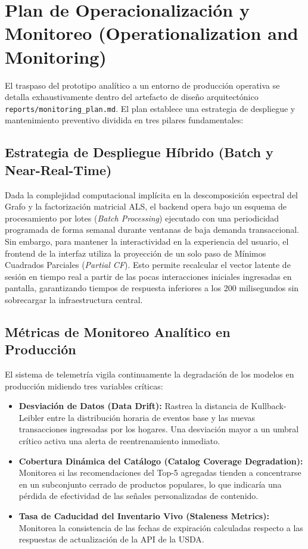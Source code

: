 \documentclass[11pt,a4paper]{article}
\begin{document}
\section{Plan de Operacionalización y Monitoreo (Operationalization and Monitoring)}
El traspaso del prototipo analítico a un entorno de producción operativa se detalla exhaustivamente dentro del artefacto de diseño arquitectónico \texttt{reports/monitoring\_plan.md}. El plan establece una estrategia de despliegue y mantenimiento preventivo dividida en tres pilares fundamentales:

\subsection{Estrategia de Despliegue Híbrido (Batch y Near-Real-Time)}
Dada la complejidad computacional implícita en la descomposición espectral del Grafo y la factorización matricial ALS, el backend opera bajo un esquema de procesamiento por lotes (\textit{Batch Processing}) ejecutado con una periodicidad programada de forma semanal durante ventanas de baja demanda transaccional. Sin embargo, para mantener la interactividad en la experiencia del usuario, el frontend de la interfaz utiliza la proyección de un solo paso de Mínimos Cuadrados Parciales (\textit{Partial CF}). Esto permite recalcular el vector latente de sesión en tiempo real a partir de las pocas interacciones iniciales ingresadas en pantalla, garantizando tiempos de respuesta inferiores a los 200 milisegundos sin sobrecargar la infraestructura central.

\subsection{Métricas de Monitoreo Analítico en Producción}
El sistema de telemetría vigila continuamente la degradación de los modelos en producción midiendo tres variables críticas:
\begin{itemize}
    \item \textbf{Desviación de Datos (Data Drift):} Rastrea la distancia de Kullback-Leibler entre la distribución horaria de eventos base y las nuevas transacciones ingresadas por los hogares. Una desviación mayor a un umbral crítico activa una alerta de reentrenamiento inmediato.
    \item \textbf{Cobertura Dinámica del Catálogo (Catalog Coverage Degradation):} Monitorea si las recomendaciones del Top-5 agregadas tienden a concentrarse en un subconjunto cerrado de productos populares, lo que indicaría una pérdida de efectividad de las señales personalizadas de contenido.
    \item \textbf{Tasa de Caducidad del Inventario Vivo (Staleness Metrics):} Monitorea la consistencia de las fechas de expiración calculadas respecto a las respuestas de actualización de la API de la USDA.
\end{itemize}
\end{document}
